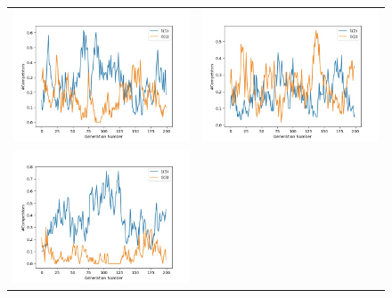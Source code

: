 \documentclass{article}
\begin{document}
\begin{figure}[H]
	\centering
	\begin{adjustbox}{width=0.6\paperwidth}
		\begin{tabular}{c c}
			\includegraphics{Codes/Problem_2 Construction_2/Comp_1.jpg} & \includegraphics{Codes/Problem_2 Construction_2/Comp_2.jpg} \\
			\includegraphics{Codes/Problem_2 Construction_2/Comp_3.jpg}&

\end{tabular}
\end{adjustbox}
\end{figure}
\end{document}

